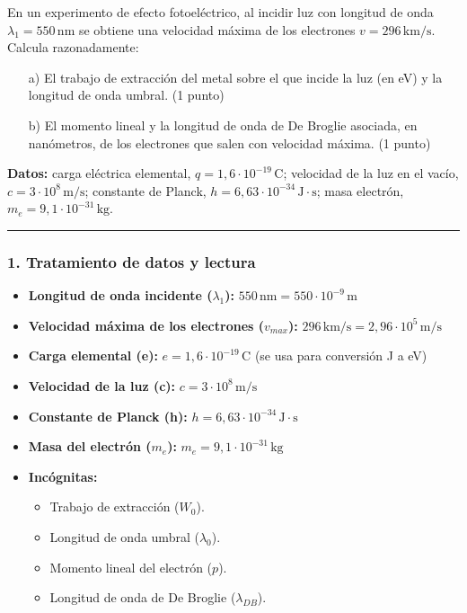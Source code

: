 \begin{cajaenunciado}
En un experimento de efecto fotoeléctrico, al incidir luz con longitud de onda $\lambda_1 = 550\,\text{nm}$ se obtiene una velocidad máxima de los electrones $v = 296\,\text{km/s}$. Calcula razonadamente:
\begin{enumerate}
    \item[a)] El trabajo de extracción del metal sobre el que incide la luz (en eV) y la longitud de onda umbral. (1 punto)
    \item[b)] El momento lineal y la longitud de onda de De Broglie asociada, en nanómetros, de los electrones que salen con velocidad máxima. (1 punto)
\end{enumerate}
\textbf{Datos:} carga eléctrica elemental, $q=1,6\cdot10^{-19}\,\text{C}$; velocidad de la luz en el vacío, $c=3\cdot10^{8}\,\text{m/s}$; constante de Planck, $h=6,63\cdot10^{-34}\,\text{J}\cdot\text{s}$; masa electrón, $m_e=9,1\cdot10^{-31}\,\text{kg}$.
\end{cajaenunciado}
\hrule

\subsubsection*{1. Tratamiento de datos y lectura}
\begin{itemize}
    \item \textbf{Longitud de onda incidente ($\lambda_1$):} $550\,\text{nm} = 550 \cdot 10^{-9}\,\text{m}$
    \item \textbf{Velocidad máxima de los electrones ($v_{max}$):} $296\,\text{km/s} = 2,96 \cdot 10^5\,\text{m/s}$
    \item \textbf{Carga elemental (e):} $e = 1,6 \cdot 10^{-19}\,\text{C}$ (se usa para conversión J a eV)
    \item \textbf{Velocidad de la luz (c):} $c = 3 \cdot 10^8\,\text{m/s}$
    \item \textbf{Constante de Planck (h):} $h = 6,63 \cdot 10^{-34}\,\text{J}\cdot\text{s}$
    \item \textbf{Masa del electrón ($m_e$):} $m_e = 9,1 \cdot 10^{-31}\,\text{kg}$
    \item \textbf{Incógnitas:}
    \begin{itemize}
        \item Trabajo de extracción ($W_0$).
        \item Longitud de onda umbral ($\lambda_0$).
        \item Momento lineal del electrón ($p$).
        \item Longitud de onda de De Broglie ($\lambda_{DB}$).
    \end{itemize}
\end{itemize}

